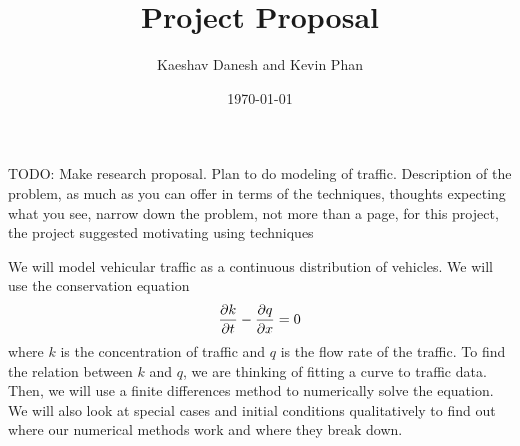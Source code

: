 \documentclass[12pt]{article}
\title{Project Proposal}
\author{Kaeshav Danesh and Kevin Phan}
\date{\today}
\begin{document}
	
	\maketitle
    TODO: Make research proposal. Plan to do modeling of traffic. Description of the problem, as much as you can offer in terms of the techniques, thoughts expecting what you see, narrow down the problem, not more than a page, for this project, the project suggested motivating using techniques 

    We will model vehicular traffic as a continuous distribution of vehicles. We will use the conservation equation 
    \begin{equation}
        \pdv{k}{t} - \pdv{q}{x} = 0
    \end{equation}
    where $k$ is the concentration of traffic and $q$ is the flow rate of the traffic. To find the relation between $k$ and $q$, we are thinking of fitting a curve to traffic data. Then, we will use a finite differences method to numerically solve the equation. We will also look at special cases and initial conditions qualitatively to find out where our numerical methods work and where they break down. 
\end{document}

